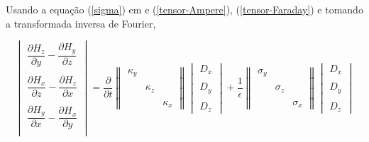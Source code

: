 \documentclass[a4paper,10pt]{article}
\begin{document}
Usando a equação (\ref{sigma}) em  e (\ref{tensor-Ampere}), (\ref{tensor-Faraday}) e tomando a transformada inversa de Fourier,

\begin{equation}
\begin{vmatrix}
 \dfrac{\partial H_z}{\partial y} - \dfrac{\partial H_y}{\partial z}  \\
\\
 \dfrac{\partial H_x}{\partial z} - \dfrac{\partial H_z}{\partial x}  \\
\\ 
\dfrac{\partial H_y}{\partial x} - \dfrac{\partial H_x}{\partial y}  \\
  \end{vmatrix} 
= \dfrac{\partial}{\partial t} \begin{Vmatrix}
 \kappa_y &  &  \\ \\
  & \kappa_z &  \\ \\
  &  & \kappa_x 
\end{Vmatrix} 
 \begin{vmatrix}
 D_x \\ \\
 D_y \\ \\
 D_z 
 \end{vmatrix} +  
\frac{1}{\epsilon}
\begin{Vmatrix}
 \sigma_y &  &  \\ \\
  & \sigma_z &  \\ \\
  &  & \sigma_x 
\end{Vmatrix} 
 \begin{vmatrix}
 D_x \\ \\
 D_y \\ \\
 D_z 
  \end{vmatrix} \label{base-Ampere}
\end{equation}
\end{document}
